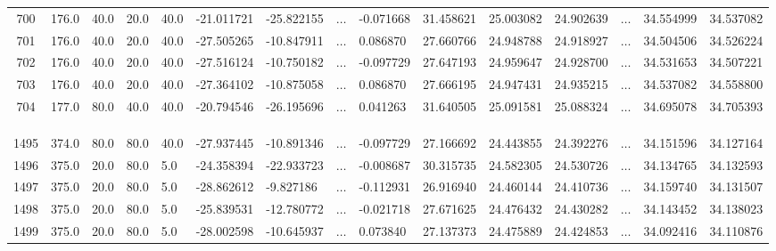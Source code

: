 \documentclass{beamer}
\begin{document}
\begin{frame}
\begin{table}
{\begin{tabular}{ccp{0.8cm}p{0.8cm}p{0.8cm}p{1.8cm}p{1.8cm}p{0.3cm}p{1.6cm}p{1.6cm}p{1.6cm}p{1.6cm}p{0.3cm}p{1.6cm}p{1.6cm}}
				700 &     176.0 &  40.0 &  20.0 &  40.0 &      -21.011721 &      -25.822155 &$\dots$&            -0.071668 &     31.458621 &     25.003082 &     24.902639 & $\dots$&         34.554999 &         34.537082 \\
				701 &     176.0 &  40.0 &  20.0 &  40.0 &      -27.505265 &      -10.847911 &$\dots$&             0.086870 &     27.660766 &     24.948788 &     24.918927 & $\dots$&         34.504506 &         34.526224 \\
				702 &     176.0 &  40.0 &  20.0 &  40.0 &      -27.516124 &      -10.750182 &$\dots$&            -0.097729 &     27.647193 &     24.959647 &     24.928700 & $\dots$&         34.531653 &         34.507221 \\
				703 &     176.0 &  40.0 &  20.0 &  40.0 &      -27.364102 &      -10.875058 &$\dots$&             0.086870 &     27.666195 &     24.947431 &     24.935215 & $\dots$&         34.537082 &         34.558800 \\
				704 &     177.0 &  80.0 &  40.0 &  40.0 &      -20.794546 &      -26.195696 &$\dots$&             0.041263 &     31.640505 &     25.091581 &     25.088324 &$\dots$&          34.695078 &         34.705393 \\
				
				\bottomrule
				&&&&&&&&&&&&&&\\
				&&&&&&&\sbox0{\dots}\makebox[\wd0]{\vdots}&&&&&&&\\
				&&&&&&&&&&&&&&\\
				\toprule
				
				1495 &     374.0 &  80.0 &  80.0 &  40.0 &      -27.937445 &      -10.891346 &$\dots$&            -0.097729 &     27.166692 &     24.443855 &     24.392276 &$\dots$&          34.151596 &         34.127164 \\
				1496 &     375.0 &  20.0 &  80.0 &   5.0 &      -24.358394 &      -22.933723 &$\dots$&            -0.008687 &     30.315735 &     24.582305 &     24.530726 &$\dots$&          34.134765 &         34.132593 \\
				1497 &     375.0 &  20.0 &  80.0 &   5.0 &      -28.862612 &       -9.827186 &$\dots$&            -0.112931 &     26.916940 &     24.460144 &     24.410736 &$\dots$&          34.159740 &         34.131507 \\
				1498 &     375.0 &  20.0 &  80.0 &   5.0 &      -25.839531 &      -12.780772 &$\dots$&            -0.021718 &     27.671625 &     24.476432 &     24.430282 & $\dots$&         34.143452 &         34.138023 \\
				1499 &     375.0 &  20.0 &  80.0 &   5.0 &      -28.002598 &      -10.645937 &$\dots$&             0.073840 &     27.137373 &     24.475889 &     24.424853 &$\dots$&          34.092416 &         34.110876 \\
				\bottomrule[0.5mm]
		\end{tabular}}
	\end{table}
\end{frame}
\end{document}
